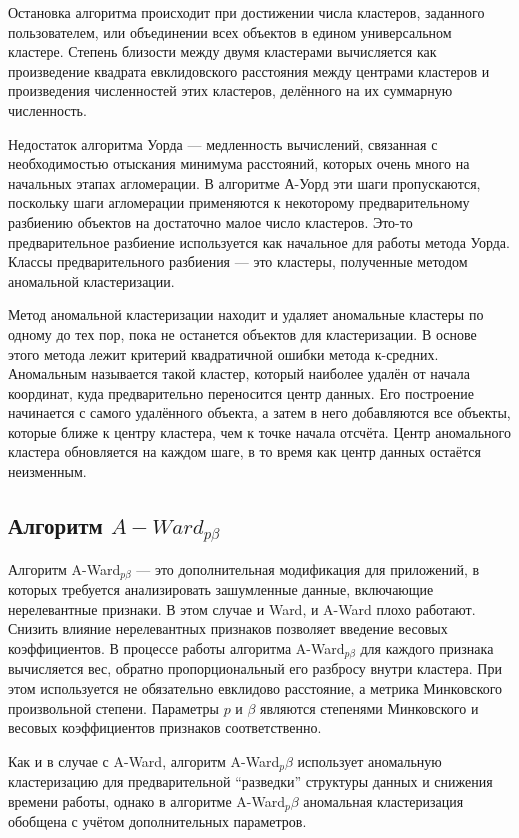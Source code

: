 \documentclass[12pt,tikz]{instruction}
\begin{document}
Остановка алгоритма происходит при достижении числа кластеров, заданного пользователем, или объединении всех объектов в едином универсальном кластере. Степень близости между двумя кластерами вычисляется как произведение квадрата евклидовского расстояния между центрами кластеров и произведения численностей этих кластеров, делённого на их суммарную численность. 

Недостаток алгоритма Уорда --- медленность вычислений, связанная с необходимостью отыскания минимума расстояний, которых очень много на начальных этапах агломерации. В алгоритме А-Уорд эти шаги пропускаются, поскольку шаги агломерации применяются к некоторому предварительному разбиению объектов на достаточно малое число кластеров. Это-то предварительное разбиение используется как начальное для работы метода Уорда. Классы предварительного разбиения --- это кластеры, полученные методом аномальной кластеризации.

Метод аномальной кластеризации находит и удаляет аномальные кластеры по одному до тех пор, пока не останется объектов для кластеризации. В основе этого метода лежит критерий квадратичной ошибки метода к-средних. Аномальным называется такой кластер, который наиболее удалён от начала координат, куда предварительно переносится центр данных. Его построение начинается с самого удалённого объекта, а затем в него добавляются все объекты, которые ближе к центру кластера, чем к точке начала отсчёта. Центр аномального кластера обновляется на каждом шаге, в то время как центр данных остаётся неизменным.


\subsection{Алгоритм $ A-Ward_{p\beta} $}
Алгоритм A-Ward$_{p\beta}$ --- это дополнительная модификация для приложений, в которых требуется анализировать зашумленные данные, включающие нерелевантные признаки. В этом случае и Ward, и A-Ward плохо работают. Снизить влияние нерелевантных признаков позволяет введение весовых коэффициентов. В процессе работы алгоритма A-Ward$_{p\beta}$ для каждого признака вычисляется вес, обратно пропорциональный его разбросу  внутри кластера. При этом используется не обязательно евклидово расстояние, а метрика Минковского произвольной степени. Параметры $ p $ и  $ \beta $ являются степенями Минковского и 
весовых коэффициентов признаков соответственно.

Как и в случае с A-Ward, алгоритм A-Ward$ _p\beta $ использует аномальную кластеризацию для предварительной ``разведки'' структуры данных и снижения времени работы, однако в алгоритме A-Ward$_p\beta$ аномальная кластеризация обобщена с учётом дополнительных параметров.
\end{document}
